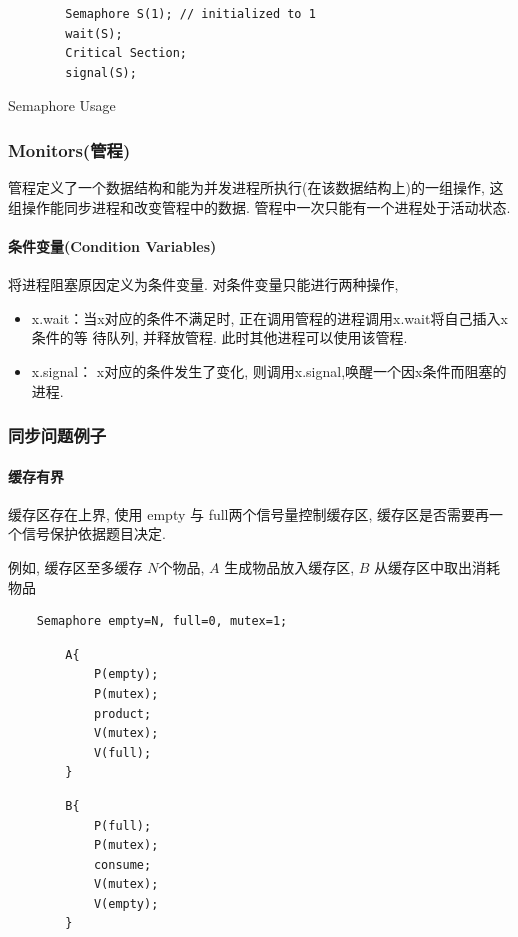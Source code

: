 \begin{code}
    \begin{verbatim}
        Semaphore S(1); // initialized to 1
        wait(S);
        Critical Section;
        signal(S);
    \end{verbatim}
    \caption{Semaphore Usage}
\end{code}

\subsubsection{Monitors(管程)}
管程定义了一个数据结构和能为并发进程所执行(在该数据结构上)的一组操作, 这组操作能同步进程和改变管程中的数据. 管程中一次只能有一个进程处于活动状态. 

\paragraph{条件变量(Condition Variables)}将进程阻塞原因定义为条件变量. 对条件变量只能进行两种操作, 
\begin{itemize}\small
    \item x.wait：当x对应的条件不满足时, 正在调用管程的进程调用x.wait将自己插入x条件的等
    待队列, 并释放管程. 此时其他进程可以使用该管程. 
    \item x.signal： x对应的条件发生了变化, 则调用x.signal,唤醒一个因x条件而阻塞的进程. 
\end{itemize}

\subsubsection{同步问题例子}
\paragraph{缓存有界}缓存区存在上界, 使用 empty 与 full两个信号量控制缓存区, 缓存区是否需要再一个信号保护依据题目决定. 

例如, 缓存区至多缓存 $N$个物品, $A$ 生成物品放入缓存区, $B$ 从缓存区中取出消耗物品
\begin{verbatim}
    Semaphore empty=N, full=0, mutex=1;
\end{verbatim}
\vspace{-\medskipamount}
\vspace{-2\baselineskip}
\vspace{0.4pt}
\begin{multicols}{2}
    \begin{verbatim}
        A{
            P(empty);
            P(mutex);
            product;
            V(mutex);
            V(full);
        }
    \end{verbatim}
    \columnbreak
    \begin{verbatim}
        B{
            P(full);
            P(mutex);
            consume;
            V(mutex);
            V(empty);
        }
    \end{verbatim}
\end{multicols}

